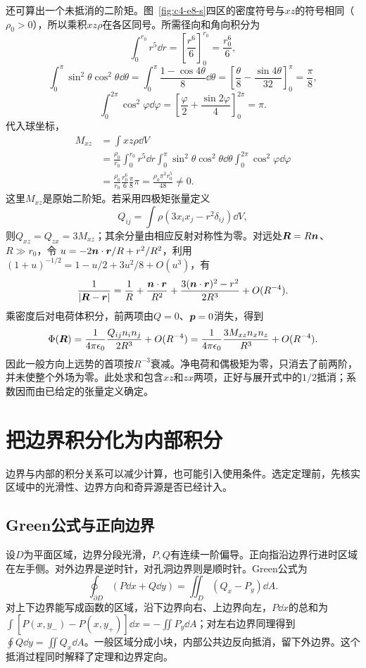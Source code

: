 \begin{solution}
还可算出一个未抵消的二阶矩。图~\ref{fig:c4-e8-s}四区的密度符号与$xz$的符号相同（$\rho_0>0$），所以乘积$xz\rho$在各区同号。所需径向和角向积分为
\[\int_0^{r_0}r^5\dd r=\left[\frac{r^6}{6}\right]_0^{r_0}=\frac{r_0^6}{6},\]
\[\int_0^\pi\sin^2\theta\cos^2\theta\dd\theta
=\int_0^\pi\frac{1-\cos4\theta}{8}\dd\theta
=\left[\frac\theta8-\frac{\sin4\theta}{32}\right]_0^\pi=\frac\pi8,\]
\[\int_0^{2\pi}\cos^2\varphi\dd\varphi
=\left[\frac\varphi2+\frac{\sin2\varphi}{4}\right]_0^{2\pi}=\pi.\]
代入球坐标，
\[\begin{aligned}
M_{xz}&=\int xz\rho\dd V\\
&=\frac{\rho_0}{r_0}\int_0^{r_0}r^5\dd r
\int_0^\pi\sin^2\theta\cos^2\theta\dd\theta
\int_0^{2\pi}\cos^2\varphi\dd\varphi\\
&=\frac{\rho_0}{r_0}\frac{r_0^6}{6}\frac\pi8\pi
=\boxed{\frac{\rho_0\pi^2r_0^5}{48}}\ne0.
\end{aligned}\]
这里$M_{xz}$是原始二阶矩。若采用四极矩张量定义
\[Q_{ij}=\int\rho(3x_ix_j-r^2\delta_{ij})\dd V,\]
则$Q_{xz}=Q_{zx}=3M_{xz}$；其余分量由相应反射对称性为零。对远处$\bm{R}=R\bm{n}$、$R\gg r_0$，令
$u=-2\bm{n}\cdot\bm{r}/R+r^2/R^2$，利用$(1+u)^{-1/2}=1-u/2+3u^2/8+O(u^3)$，有
\[\frac1{|\bm{R}-\bm{r}|}
=\frac1R+\frac{\bm{n}\cdot\bm{r}}{R^2}
+\frac{3(\bm{n}\cdot\bm{r})^2-r^2}{2R^3}+O(R^{-4}).\]
乘密度后对电荷体积分，前两项由$Q=0$、$\bm{p}=0$消失，得到
\[\Phi(\bm{R})=\frac1{4\pi\epsilon_0}
\frac{Q_{ij}n_in_j}{2R^3}+O(R^{-4})
=\frac1{4\pi\epsilon_0}\frac{3M_{xz}n_xn_z}{R^3}+O(R^{-4}).\]
因此一般方向上远势的首项按$R^{-3}$衰减。净电荷和偶极矩为零，只消去了前两阶，并未使整个外场为零。此处求和包含$xz$和$zx$两项，正好与展开式中的$1/2$抵消；系数因而由已给定的张量定义确定。

\end{solution}

\section{把边界积分化为内部积分}\label{sec:c4-theorems}
边界与内部的积分关系可以减少计算，也可能引入使用条件。选定定理前，先核实区域中的光滑性、边界方向和奇异源是否已经计入。

\subsection{Green公式与正向边界}
设$D$为平面区域，边界分段光滑，$P,Q$有连续一阶偏导。正向指沿边界行进时区域在左手侧。对外边界是逆时针，对孔洞边界则是顺时针。Green公式为
\[\boxed{\oint_{\partial D}(P\dd x+Q\dd y)=\iint_D(Q_x-P_y)\dd A}.\]
对上下边界能写成函数的区域，沿下边界向右、上边界向左，$P\dd x$的总和为$\int[P(x,y_-)-P(x,y_+)]\dd x=-\iint P_y\dd A$；对左右边界同理得到$\oint Q\dd y=\iint Q_x\dd A$。一般区域分成小块，内部公共边反向抵消，留下外边界。这个抵消过程同时解释了定理和边界定向。

